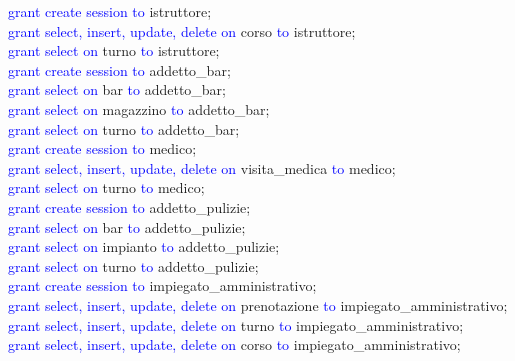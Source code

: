 \documentclass{article}
\begin{document}
\begin{flushleft}
        \vspace{2mm}
        \textcolor{blue}{grant create session to} istruttore; \\
        \textcolor{blue}{grant select, insert, update, delete on} corso \textcolor{blue}{to} istruttore; \\
        \textcolor{blue}{grant select on} turno \textcolor{blue}{to} istruttore; \\
        \vspace{2mm}
        \textcolor{blue}{grant create session to} addetto\_bar; \\
        \textcolor{blue}{grant select on} bar \textcolor{blue}{to} addetto\_bar; \\
        \textcolor{blue}{grant select on} magazzino \textcolor{blue}{to} addetto\_bar; \\
        \textcolor{blue}{grant select on} turno \textcolor{blue}{to} addetto\_bar; \\
        \vspace{2mm}
        \textcolor{blue}{grant create session to} medico; \\
        \textcolor{blue}{grant select, insert, update, delete on} visita\_medica \textcolor{blue}{to} medico; \\
        \textcolor{blue}{grant select on} turno \textcolor{blue}{to} medico; \\
        \vspace{2mm}
        \textcolor{blue}{grant create session to} addetto\_pulizie; \\
        \textcolor{blue}{grant select on} bar \textcolor{blue}{to} addetto\_pulizie; \\
        \textcolor{blue}{grant select on} impianto \textcolor{blue}{to} addetto\_pulizie; \\
        \textcolor{blue}{grant select on} turno \textcolor{blue}{to} addetto\_pulizie; \\
        \vspace{2mm}
        \textcolor{blue}{grant create session to} impiegato\_amministrativo; \\
        \textcolor{blue}{grant select, insert, update, delete on} prenotazione \textcolor{blue}{to} impiegato\_amministrativo; \\
        \textcolor{blue}{grant select, insert, update, delete on} turno \textcolor{blue}{to} impiegato\_amministrativo; \\
        \textcolor{blue}{grant select, insert, update, delete on} corso \textcolor{blue}{to} impiegato\_amministrativo; \\

\end{flushleft}
\end{document}
